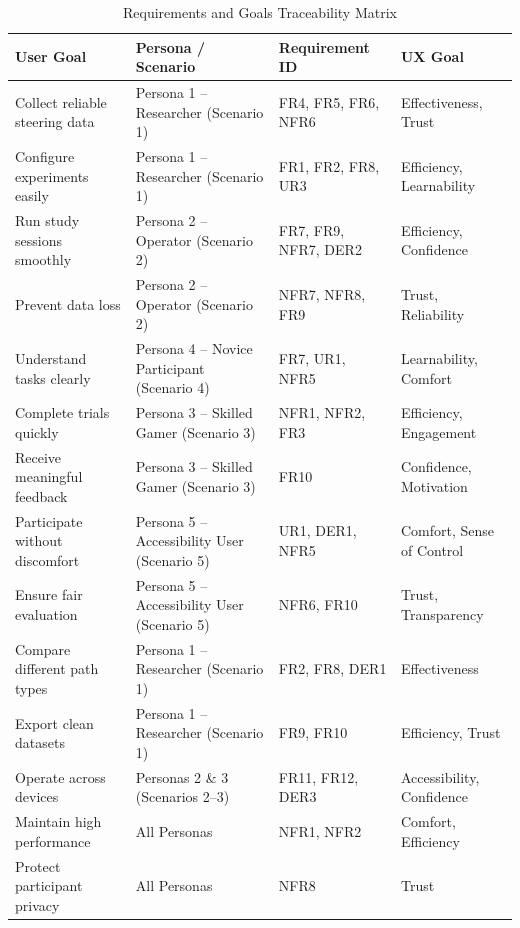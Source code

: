 \documentclass[sigconf]{acmart}
\begin{document}
\begin{table}[h]
\centering
\caption{Requirements and Goals Traceability Matrix}
\begin{tabular}{p{4cm}p{5cm}p{3 cm}p{3cm}}
\toprule
\textbf{User Goal} & \textbf{Persona / Scenario} & \textbf{Requirement ID} & \textbf{UX Goal} \\
\midrule

Collect reliable steering data & Persona 1 – Researcher (Scenario 1) & FR4, FR5, FR6, NFR6 & Effectiveness, Trust \\

Configure experiments easily & Persona 1 – Researcher (Scenario 1) & FR1, FR2, FR8, UR3 & Efficiency, Learnability \\

Run study sessions smoothly & Persona 2 – Operator (Scenario 2) & FR7, FR9, NFR7, DER2 & Efficiency, Confidence \\

Prevent data loss & Persona 2 – Operator (Scenario 2) & NFR7, NFR8, FR9 & Trust, Reliability \\

Understand tasks clearly & Persona 4 – Novice Participant (Scenario 4) & FR7, UR1, NFR5 & Learnability, Comfort \\

Complete trials quickly & Persona 3 – Skilled Gamer (Scenario 3) & NFR1, NFR2, FR3 & Efficiency, Engagement \\ 

Receive meaningful feedback & Persona 3 – Skilled Gamer (Scenario 3) & FR10 & Confidence, Motivation \\

Participate without discomfort & Persona 5 – Accessibility User (Scenario 5) & UR1, DER1, NFR5 & Comfort, Sense of Control \\

Ensure fair evaluation & Persona 5 – Accessibility User (Scenario 5) & NFR6, FR10 & Trust, Transparency \\

Compare different path types & Persona 1 – Researcher (Scenario 1) & FR2, FR8, DER1 & Effectiveness \\

Export clean datasets & Persona 1 – Researcher (Scenario 1) & FR9, FR10 & Efficiency, Trust \\

Operate across devices & Personas 2 \& 3 (Scenarios 2–3) & FR11, FR12, DER3 & Accessibility, Confidence \\

Maintain high performance & All Personas & NFR1, NFR2 & Comfort, Efficiency \\

Protect participant privacy & All Personas & NFR8 & Trust \\

\bottomrule
\end{tabular}
\end{table} 
\end{document}
